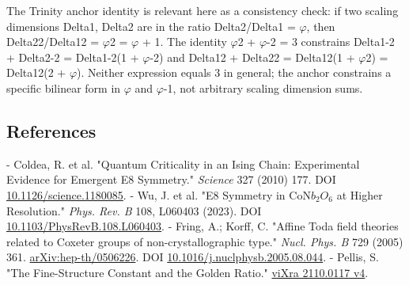   The Trinity anchor identity is relevant here as a consistency check: if two scaling
  dimensions Delta1, Delta2 are in the ratio Delta2/Delta1 = $\varphi$, then Delta22/Delta12 =
  $\varphi$2 = $\varphi$ + 1. The identity $\varphi$2 + $\varphi$-2 = 3 constrains Delta1-2 + Delta2-2 = Delta1-2(1 +
  $\varphi$-2) and Delta12 + Delta22 = Delta12(1 + $\varphi$2) = Delta12(2 + $\varphi$). Neither expression
  equals 3 in general; the anchor constrains a specific bilinear form in $\varphi$ and $\varphi$-1, not
  arbitrary scaling dimension sums.

\subsection{References}

- Coldea, R. et al. "Quantum Criticality in an Ising Chain: Experimental Evidence for Emergent E8 Symmetry." \textit{Science} 327 (2010) 177. DOI \href{https://doi.org/10.1126/science.1180085}{10.1126/science.1180085}.
- Wu, J. et al. "E8 Symmetry in CoN$b_{2}$$O_{6}$ at Higher Resolution." \textit{Phys. Rev. B} 108, L060403 (2023). DOI \href{https://doi.org/10.1103/PhysRevB.108.L060403}{10.1103/PhysRevB.108.L060403}.
- Fring, A.; Korff, C. "Affine Toda field theories related to Coxeter groups of non-crystallographic type." \textit{Nucl. Phys. B} 729 (2005) 361. \href{https://arxiv.org/abs/hep-th/0506226}{arXiv:hep-th/0506226}. DOI \href{https://doi.org/10.1016/j.nuclphysb.2005.08.044}{10.1016/j.nuclphysb.2005.08.044}.
- Pellis, S. "The Fine-Structure Constant and the Golden Ratio." \href{https://vixra.org/pdf/2110.0117v4.pdf}{viXra 2110.0117 v4}.
